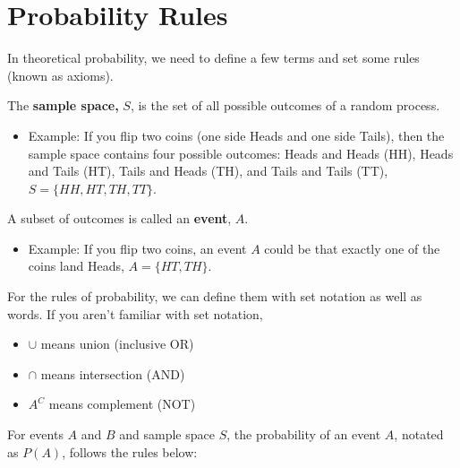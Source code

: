 \documentclass[
]{book}
\providecommand{\tightlist}{%
  \setlength{\itemsep}{0pt}\setlength{\parskip}{0pt}}
\begin{document}
\hypertarget{probability-rules}{%
\section{Probability Rules}\label{probability-rules}}

In theoretical probability, we need to define a few terms and set some rules (known as axioms).

The \textbf{sample space,} \(S\), is the set of all possible outcomes of a random process.

\begin{itemize}
\tightlist
\item
  Example: If you flip two coins (one side Heads and one side Tails), then the sample space contains four possible outcomes: Heads and Heads (HH), Heads and Tails (HT), Tails and Heads (TH), and Tails and Tails (TT), \(S = \{HH,HT,TH,TT\}\).
\end{itemize}

A subset of outcomes is called an \textbf{event}, \(A\).

\begin{itemize}
\tightlist
\item
  Example: If you flip two coins, an event \(A\) could be that exactly one of the coins land Heads, \(A = \{HT,TH\}\).
\end{itemize}

For the rules of probability, we can define them with set notation as well as words. If you aren't familiar with set notation,

\begin{itemize}
\tightlist
\item
  \(\cup\) means union (inclusive OR)
\item
  \(\cap\) means intersection (AND)
\item
  \(A^C\) means complement (NOT)
\end{itemize}

For events \(A\) and \(B\) and sample space \(S\), the probability of an event \(A\), notated as \(P(A)\), follows the rules below:
\end{document}
